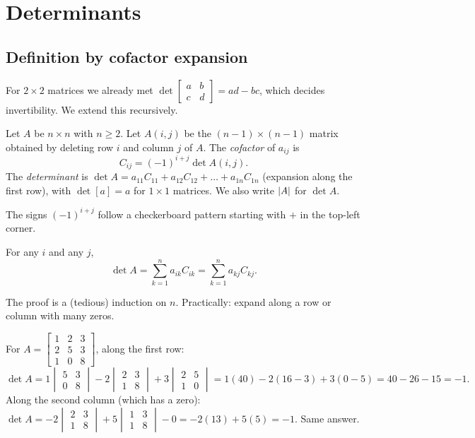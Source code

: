 \chapter{Determinants}

\section{Definition by cofactor expansion}

For $2\times2$ matrices we already met $\det\begin{bmatrix}a&b\\c&d\end{bmatrix}=ad-bc$, which decides
invertibility. We extend this recursively.

\begin{definition}
Let $A$ be $n\times n$ with $n\ge2$. Let $A(i,j)$ be the $(n-1)\times(n-1)$ matrix obtained by deleting
row $i$ and column $j$ of $A$. The \emph{cofactor} of $a_{ij}$ is
\[
  C_{ij}=(-1)^{i+j}\det A(i,j).
\]
The \emph{determinant} is $\det A = a_{11}C_{11}+a_{12}C_{12}+\dots+a_{1n}C_{1n}$ (expansion along the first
row), with $\det[a]=a$ for $1\times1$ matrices. We also write $\left\lvert A \right\rvert$ for $\det A$.
\end{definition}

The signs $(-1)^{i+j}$ follow a checkerboard pattern starting with $+$ in the top-left corner.

\begin{theorem}
For any $i$ and any $j$,
\[
  \det A=\sum_{k=1}^n a_{ik}C_{ik}=\sum_{k=1}^n a_{kj}C_{kj}.
\]
\end{theorem}

The proof is a (tedious) induction on $n$. Practically: expand along a row or column with many zeros.

\begin{example}
For $A=\begin{bmatrix}1&2&3\\2&5&3\\1&0&8\end{bmatrix}$, along the first row:
\[
\det A = 1\begin{vmatrix}5&3\\0&8\end{vmatrix}-2\begin{vmatrix}2&3\\1&8\end{vmatrix}+3\begin{vmatrix}2&5\\1&0\end{vmatrix}
=1(40)-2(16-3)+3(0-5)=40-26-15=-1.
\]
Along the second column (which has a zero):
$\det A = -2\begin{vmatrix}2&3\\1&8\end{vmatrix}+5\begin{vmatrix}1&3\\1&8\end{vmatrix}-0
= -2(13)+5(5) = -1$. Same answer.
\end{example}

